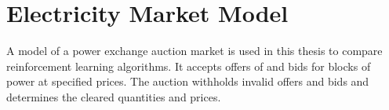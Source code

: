 %
%
%
%
%
%
%

\section{Electricity Market Model}
A model of a power exchange auction market is used in this thesis to compare
reinforcement learning algorithms.  It accepts offers of and bids for blocks of
power at specified prices.  The auction withholds invalid offers and bids and
determines the cleared quantities and prices.

